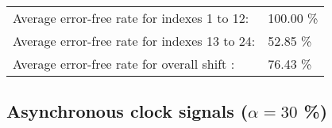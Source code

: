 \begin{table}[h]
\begin{center}
\begin{tabular}{|c|c|c|c|c|}
\end{tabular}


\flushleft
\begin{tabular}{l l}
Average error-free rate for indexes  1 to 12: & 100.00 \% \\
Average error-free rate for indexes 13 to 24: &  52.85 \% \\
Average error-free rate for overall shift   : &  76.43 \% \\

\end{tabular}


\end{center}
\end{table}


\pagebreak
\subsection{Asynchronous clock signals ($\alpha=30$ \%)}

